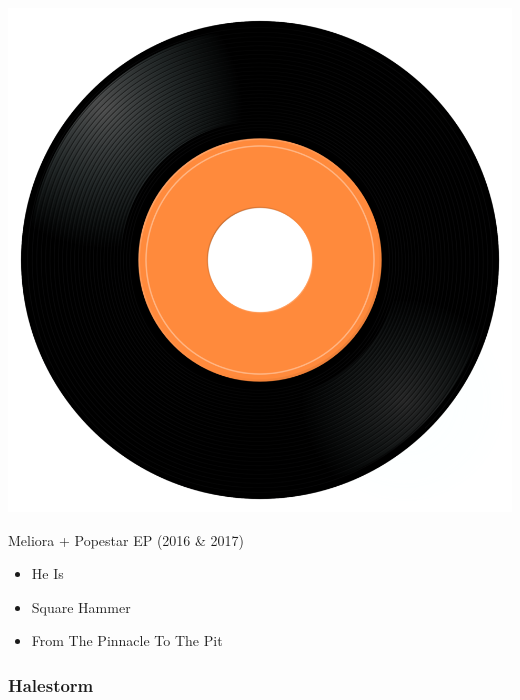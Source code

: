 \begin{minipage}[t]{0.25\textwidth}\vspace{0pt}
\captionsetup{type=figure}
\includegraphics[width=\textwidth]{Images/cover.png}
\caption*{Meliora + Popestar EP (2016 \& 2017)}
\end{minipage}
\begin{minipage}[t]{0.25\textwidth}\vspace{0pt}
\begin{itemize}[nosep,leftmargin=1em,labelwidth=*,align=left]
	\setlength{\itemsep}{0pt}
	\item He Is
	\item Square Hammer
	\item From The Pinnacle To The Pit
\end{itemize}
\end{minipage}

\subsubsection{Halestorm}


